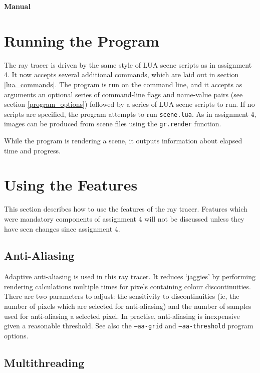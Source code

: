 \documentclass{article}
\begin{document}
\begin{center}{\bf \LARGE Manual}\end{center}

\tableofcontents

\section{Running the Program}
\label{running_the_program}

The ray tracer is driven by the same style of LUA scene scripts as in assignment
4. It now accepts several additional commands, which are laid out in section
\ref{lua_commands}. The program is run on the command line, and it accepts as
arguments an optional series of command-line flags and name-value pairs (see
section \ref{program_options}) followed by a series of LUA scene scripts to run.
If no scripts are specified, the program attempts to run {\tt scene.lua}. As in
assignment 4, images can be produced from scene files using the {\tt gr.render}
function.

While the program is rendering a scene, it outputs information about elapsed
time and progress.

\section{Using the Features}
\label{using_the_features}

This section describes how to use the features of the ray tracer. Features which
were mandatory components of assignment 4 will not be discussed unless they have
seen changes since assignment 4.

\subsection{Anti-Aliasing}
\label{anti_aliasing}

Adaptive anti-aliasing is used in this ray tracer. It reduces `jaggies' by
performing rendering calculations multiple times for pixels containing colour
discontinuities. There are two parameters to adjust: the sensitivity to
discontinuities (ie, the number of pixels which are selected for anti-aliasing)
and the number of samples used for anti-aliasing a selected pixel. In practise,
anti-aliasing is inexpensive given a reasonable threshold. See also the
{\tt --aa-grid} and {\tt --aa-threshold} program options.

\subsection{Multithreading}
\label{multithreading}
\end{document}
